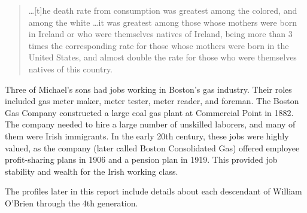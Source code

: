 \begin{quote}
	\ldots[t]he death rate from consumption was greatest among the colored, and among the white \ldots it was greatest among those whose mothers were born in Ireland or who were themselves natives of Ireland, being more than 3 times the corresponding rate for those whose mothers were born in the United States, and almost double the rate for those who were themselves natives of this country.\cite{VitalStatistics}
\end{quote}

Three of Michael's sons had jobs working in Boston's gas industry. Their roles included gas meter maker, meter tester, meter reader, and foreman. The Boston Gas Company constructed a large coal gas plant at Commercial Point in 1882. The company needed to hire a large number of unskilled laborers, and many of them were Irish immigrants.\cite{Keating:11} In the early 20th century, these jobs were highly valued, as the company (later called Boston Consolidated Gas) offered employee profit-sharing plans in 1906 and a pension plan in 1919. This provided job stability and wealth for the Irish working class.\cite{Keating:20}

The profiles later in this report include details about each descendant of William O'Brien through the 4th generation.

